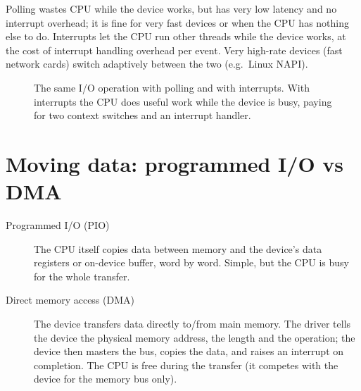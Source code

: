 \begin{important}
Polling wastes CPU while the device works, but has very low latency and no interrupt overhead;
it is fine for very fast devices or when the CPU has nothing else to do. Interrupts let the CPU
run other threads while the device works, at the cost of interrupt handling overhead per event.
Very high-rate devices (fast network cards) switch adaptively between the two (e.g.\ Linux
NAPI).
\end{important}

\begin{figure}[H]
\centering
{}
\caption{The same I/O operation with polling and with interrupts. With
interrupts the CPU does useful work while the device is busy, paying for
two context switches and an interrupt handler.}
\end{figure}

\section{Moving data: programmed I/O vs DMA}

\begin{description}
  \item[Programmed I/O (PIO)] The CPU itself copies data between memory and the device's data
    registers or on-device buffer, word by word. Simple, but the CPU is busy for the whole
    transfer.
  \item[Direct memory access (DMA)] The device transfers data directly to/from main memory.
    The driver tells the device the physical memory address, the length and the operation;
    the device then masters the bus, copies the data, and raises an interrupt on completion.
    The CPU is free during the transfer (it competes with the device for the memory bus only).
\end{description}

